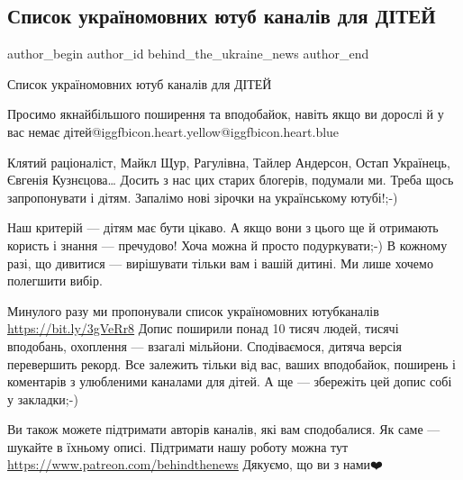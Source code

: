  
 
 
 
 
 
\subsection{Список україномовних ютуб каналів для ДІТЕЙ}
\label{sec:17_04_2021.fb.behind_the_ukraine_news.1.youtube_kanaly_deti_mova}
 
\ifcmt
 author_begin
   author_id behind_the_ukraine_news
 author_end
\fi

Список україномовних ютуб каналів для ДІТЕЙ

Просимо якнайбільшого поширення та вподобайок, навіть якщо ви дорослі й у вас
немає дітей@igg{fbicon.heart.yellow}@igg{fbicon.heart.blue}

Клятий раціоналіст, Майкл Щур, Рагулівна, Тайлер Андерсон, Остап Українець,
Євгенія Кузнєцова… Досить з нас цих старих блогерів, подумали ми. Треба щось
запропонувати і дітям. Запалімо нові зірочки на українському ютубі!;-)

Наш критерій — дітям має бути цікаво. А якщо вони з цього ще й отримають
користь і знання — пречудово! Хоча можна й просто подуркувати;-) В кожному
разі, що дивитися — вирішувати тільки вам і вашій дитині. Ми лише хочемо
полегшити вибір.

Минулого разу ми пропонували список україномовних ютубканалів
\url{https://bit.ly/3gVeRr8} Допис поширили понад 10 тисяч людей, тисячі вподобань,
охоплення — взагалі мільйони. Сподіваємося, дитяча версія перевершить рекорд.
Все залежить тільки від вас, ваших вподобайок, поширень і коментарів з
улюбленими каналами для дітей. А ще — збережіть цей допис собі у закладки;-)

Ви також можете підтримати авторів каналів, які вам сподобалися. Як саме —
шукайте в їхньому описі. Підтримати нашу роботу можна тут
\url{https://www.patreon.com/behindthenews} Дякуємо, що ви з нами❤️🖤

